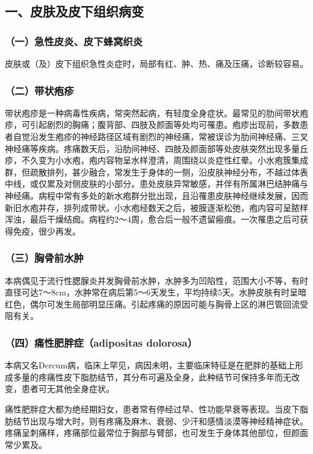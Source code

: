 \subsection{一、皮肤及皮下组织病变}

\subsubsection{（一）急性皮炎、皮下蜂窝织炎}

皮肤或（及）皮下组织急性炎症时，局部有红、肿、热、痛及压痛，诊断较容易。

\subsubsection{（二）带状疱疹}

带状疱疹是一种病毒性疾病，常突然起病，有轻度全身症状。最常见的肋间带状疱疹，可引起剧烈的胸痛；腹背部、四肢及颜面等处均可罹患。疱疹出现前，多数患者自觉沿发生疱疹的神经路径区域有剧烈的神经痛，常被误诊为肋间神经痛、三叉神经痛等疾病。疼痛数天后，沿肋间神经、四肢及颜面部等处皮肤突然出现多量丘疹，不久变为小水疱，疱内容物呈水样澄清，周围绕以炎症性红晕。小水疱簇集成群，但疏散排列，甚少融合，常发生于身体的一侧，沿皮肤神经分布，不越过体表中线，或仅累及对侧皮肤的小部分。患处皮肤异常敏感，并伴有所属淋巴结肿痛与神经痛。病程中常有多处的新水疱群分批出现，且沿罹患皮肤神经继续发展，因而新旧水疱并存，排列成带状。小水疱经数天之后，被膜逐渐松弛，疱内容可呈脓样浑浊，最后干燥结痂。病程约2～4周，愈合后一般不遗留瘢痕。一次罹患之后可获得免疫，很少再发。

\subsubsection{（三）胸骨前水肿}

本病偶见于流行性腮腺炎并发胸骨前水肿，水肿多为凹陷性，范围大小不等，有时直径可达7～8cm，水肿常在病后第5～6天发生，平均持续5天。水肿皮肤有时呈暗红色，偶尔可发生局部明显压痛。引起疼痛的原因可能与胸骨上区的淋巴管回流受阻有关。

\subsubsection{（四）痛性肥胖症（adipositas dolorosa）}

本病又名Dercum病，临床上罕见，病因未明，主要临床特征是在肥胖的基础上形成多量的疼痛性皮下脂肪结节，其分布可遍及全身，此种结节可保持多年而无改变，患者可无其他全身症状。

痛性肥胖症大都为绝经期妇女，患者常有停经过早、性功能早衰等表现。当皮下脂肪结节出现与增大时，则有疼痛及麻木、衰弱、少汗和感情淡漠等神经精神症状。疼痛呈刺痛样，疼痛部位最常位于胸部与臂部，也可发生于身体其他部位，但颜面常少累及。

